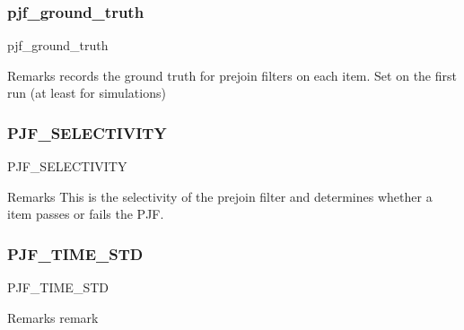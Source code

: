 \mbox{\label{classdynamicfilterapp_1_1models_1_1_join_a1ec302901059810f84b7fa227156b2e9}} 
\subsubsection{\texorpdfstring{pjf\_ground\_truth}{pjf\_ground\_truth}}
{\footnotesize\ttfamily pjf\+\_\+ground\+\_\+truth}

\begin{DoxyRemark}{Remarks}
records the ground truth for prejoin filters on each item. Set on the first run (at least for simulations) 
\end{DoxyRemark}
\mbox{\label{classdynamicfilterapp_1_1models_1_1_join_af9a4b7069818f836f5a3324c440c367d}} 
\subsubsection{\texorpdfstring{PJF\_SELECTIVITY}{PJF\_SELECTIVITY}}
{\footnotesize\ttfamily P\+J\+F\+\_\+\+S\+E\+L\+E\+C\+T\+I\+V\+I\+TY}

\begin{DoxyRemark}{Remarks}
This is the selectivity of the prejoin filter and determines whether a item passes or fails the P\+JF. 
\end{DoxyRemark}
\mbox{\label{classdynamicfilterapp_1_1models_1_1_join_aec05a5be54e1590c21b2b075334d82ca}} 
\subsubsection{\texorpdfstring{PJF\_TIME\_STD}{PJF\_TIME\_STD}}
{\footnotesize\ttfamily P\+J\+F\+\_\+\+T\+I\+M\+E\+\_\+\+S\+TD}

\begin{DoxyRemark}{Remarks}
remark 
\end{DoxyRemark}
\mbox{\label{classdynamicfilterapp_1_1models_1_1_join_aacba7fad0393ddea9ffe3688e2a984b1}} 
